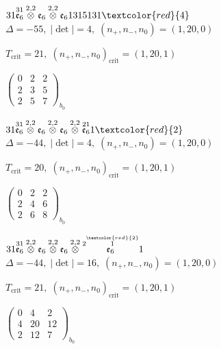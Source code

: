 \documentclass[10pt]{article}
\begin{document}
$31\overset{31}{\mathfrak{e}_6}\overset{2,2}{\otimes}\mathfrak{e}_6\overset{2,2}{\otimes}\mathfrak{e}_61315131\textcolor{red}{4}$ \quad $\Delta=-55,\; |\det|=4,\; (n_+,n_-,n_0)=(1,20,0)$

\hspace{1em}$T_{\text{crit}}=21,\; (n_+,n_-,n_0)_{\text{crit}}=(1,20,1)$

\hspace{2em}$\left(\begin{smallmatrix}0 & 2 & 2 \\ 2 & 3 & 5 \\ 2 & 5 & 7\end{smallmatrix}\right)_{\!b_0}$

\smallskip

$31\overset{31}{\mathfrak{e}_6}\overset{2,2}{\otimes}\mathfrak{e}_6\overset{2,2}{\otimes}\mathfrak{e}_6\overset{2,2}{\otimes}\overset{21}{\mathfrak{e}_6}1\textcolor{red}{2}$ \quad $\Delta=-44,\; |\det|=4,\; (n_+,n_-,n_0)=(1,20,0)$

\hspace{1em}$T_{\text{crit}}=20,\; (n_+,n_-,n_0)_{\text{crit}}=(1,20,1)$

\hspace{2em}$\left(\begin{smallmatrix}0 & 2 & 2 \\ 2 & 4 & 6 \\ 2 & 6 & 8\end{smallmatrix}\right)_{\!b_0}$

$31\overset{31}{\mathfrak{e}_6}\overset{2,2}{\otimes}\mathfrak{e}_6\overset{2,2}{\otimes}\mathfrak{e}_6\overset{2,2}{\otimes}\overset{2\overset{\textcolor{red}{2}}{1}}{\mathfrak{e}_6}1$ \quad $\Delta=-44,\; |\det|=16,\; (n_+,n_-,n_0)=(1,20,0)$

\hspace{1em}$T_{\text{crit}}=21,\; (n_+,n_-,n_0)_{\text{crit}}=(1,20,1)$

\hspace{2em}$\left(\begin{smallmatrix}0 & 4 & 2 \\ 4 & 20 & 12 \\ 2 & 12 & 7\end{smallmatrix}\right)_{\!b_0}$

\smallskip
\end{document}
